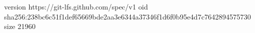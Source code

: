 version https://git-lfs.github.com/spec/v1
oid sha256:238bc6c51f1def65669bde2aa3e6344a37346f1d6f0b95e4d7c7642894575730
size 21960

